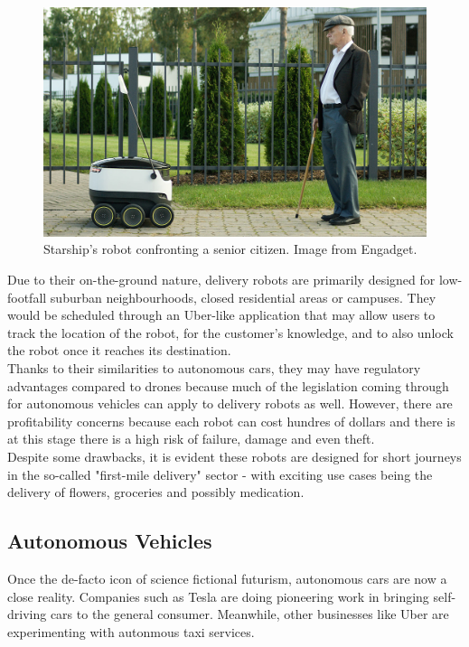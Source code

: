 \documentclass[a4paper,11pt,titlepage]{report}
\begin{document}
\begin{figure}[!hbpt]
  \center
  \includegraphics[width=\linewidth]{img/starship.jpg}
  \caption{Starship's robot confronting a senior citizen. Image from Engadget\cite{Souppouris2015}.}
  \label{fig:starship_citizen}
\end{figure}

Due to their on-the-ground nature, delivery robots are primarily designed for low-footfall suburban neighbourhoods, closed residential areas or campuses. They would be scheduled through an Uber-like application that may allow users to track the location of the robot, for the customer's knowledge, and to also unlock the robot once it reaches its destination\cite{Hohenadel2015}. \\

Thanks to their similarities to autonomous cars, they may have regulatory advantages compared to drones because much of the legislation coming through for autonomous vehicles can apply to delivery robots as well. However, there are profitability concerns because each robot can cost hundres of dollars and there is at this stage there is a high risk of failure, damage and even theft. \\

Despite some drawbacks, it is evident these robots are designed for short journeys in the so-called "first-mile delivery" sector - with exciting use cases being the delivery of flowers, groceries and possibly medication.

\subsection{Autonomous Vehicles}
Once the de-facto icon of science fictional futurism, autonomous cars are now a close reality. Companies such as Tesla are doing pioneering work in bringing self-driving cars\cite{Tesla2018} to the general consumer. Meanwhile, other businesses like Uber are experimenting with autonmous taxi services\cite{Gibbs2017}. \\
\end{document}
